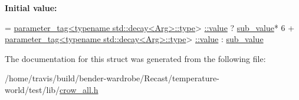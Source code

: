 {\bfseries Initial value\-:}
\begin{DoxyCode}
= 
                \hyperlink{namespacecrow_1_1json_adb9569a402d1b289a75025c8c96e5d99}{parameter\_tag<typename std::decay<Arg>::type}>
      \hyperlink{structcrow_1_1black__magic_1_1compute__parameter__tag__from__args__list_3_01_arg_00_01_args_8_8_8_4_a14aa3a0f1dc86b1e62539ffcec6701af}{::value}
                ? \hyperlink{structcrow_1_1black__magic_1_1compute__parameter__tag__from__args__list_3_01_arg_00_01_args_8_8_8_4_a4bbefabf41046c28166fcbff53fa4a09}{sub\_value}* 6 + 
      \hyperlink{namespacecrow_1_1json_adb9569a402d1b289a75025c8c96e5d99}{parameter\_tag<typename std::decay<Arg>::type}>
      \hyperlink{structcrow_1_1black__magic_1_1compute__parameter__tag__from__args__list_3_01_arg_00_01_args_8_8_8_4_a14aa3a0f1dc86b1e62539ffcec6701af}{::value}
                : \hyperlink{structcrow_1_1black__magic_1_1compute__parameter__tag__from__args__list_3_01_arg_00_01_args_8_8_8_4_a4bbefabf41046c28166fcbff53fa4a09}{sub\_value}
\end{DoxyCode}


The documentation for this struct was generated from the following file\-:\begin{DoxyCompactItemize}
\item 
/home/travis/build/bender-\/wardrobe/\-Recast/temperature-\/world/test/lib/\hyperlink{crow__all_8h}{crow\-\_\-all.\-h}\end{DoxyCompactItemize}
